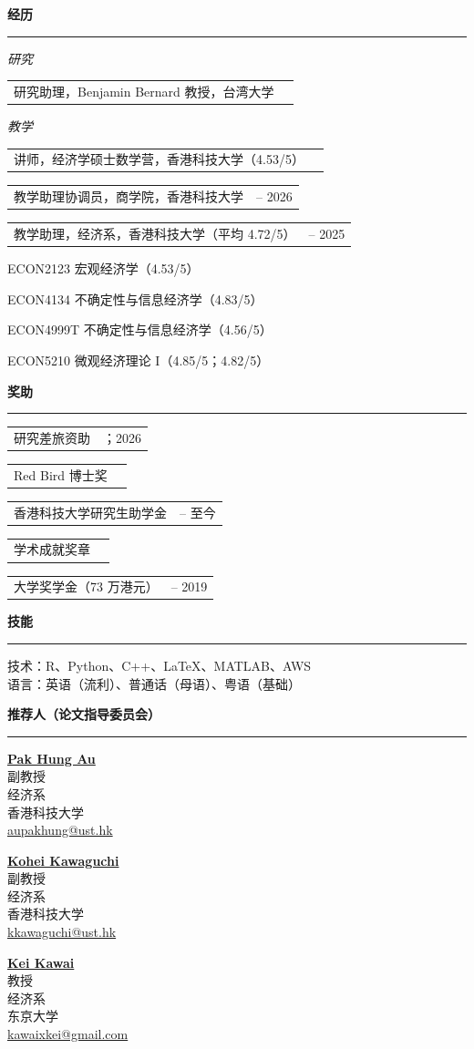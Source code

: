 \documentclass[11pt,letterpaper]{article}
\makeatletter
\newlength{\cvdatecol}
\newcommand{\sectionheader}[1]{%
  \vspace{0.45em}
  {\large\bfseries #1}\\[-0.15em]
  \rule{\textwidth}{0.4pt}\par
  \vspace{0.2em}
}
\newcommand{\cvline}[3][0em]{%
  \par\nobreak
  \noindent\hspace*{#1}%
  \begin{tabularx}{\dimexpr\textwidth-#1\relax}{@{}X@{\hspace{0.75em}}>{\raggedleft\arraybackslash}p{\cvdatecol}@{}}
  #2 & #3 \\
  \end{tabularx}%
}
\newcommand{\courseline}[1]{%
  \par\addvspace{0.22em}%
  \noindent\hspace*{3.2em}#1\par
}
\makeatother
\begin{document}
\sectionheader{经历}
{
\textit{研究}\\[-0.4em]
\cvline[1.5em]{研究助理，Benjamin Bernard 教授，台湾大学}{2020}

\vspace{-0.05em}
\textit{教学}\\[-0.4em]
\cvline[1.5em]{讲师，经济学硕士数学营，香港科技大学（4.53/5）}{2026}
\vspace{-0.1em}
\cvline[1.5em]{教学助理协调员，商学院，香港科技大学}{2025 -- 2026}
\vspace{-0.1em}
\cvline[1.5em]{教学助理，经济系，香港科技大学（平均 4.72/5）}{2020 -- 2025}
\vspace{0.05em}
\courseline{ECON2123 宏观经济学（4.53/5）}
\courseline{ECON4134 不确定性与信息经济学（4.83/5）}
\courseline{ECON4999T 不确定性与信息经济学（4.56/5）}
\courseline{ECON5210 微观经济理论 I（4.85/5；4.82/5）}
}

\sectionheader{奖助}
{
\cvline[1.5em]{研究差旅资助}{2023；2026}
\vspace{-0.1em}
\cvline[1.5em]{Red Bird 博士奖}{2022}
\vspace{-0.1em}
\cvline[1.5em]{香港科技大学研究生助学金}{2020 -- 至今}
\vspace{-0.1em}
\cvline[1.5em]{学术成就奖章}{2019}
\vspace{-0.1em}
\cvline[1.5em]{大学奖学金（73 万港元）}{2015 -- 2019}
}

\sectionheader{技能}
技术：R、Python、C++、\LaTeX、MATLAB、AWS\\
语言：英语（流利）、普通话（母语）、粤语（基础）

\sectionheader{推荐人（论文指导委员会）}
{
\noindent
\begin{minipage}[t]{0.48\textwidth}
\textbf{\href{https://aupakhung.weebly.com/}{Pak Hung Au}}\\
副教授\\
经济系\\
香港科技大学\\
\href{mailto:aupakhung@ust.hk}{aupakhung@ust.hk}
\end{minipage}\hfill
\begin{minipage}[t]{0.48\textwidth}
\textbf{\href{https://www.kohei-kawaguchi.com/}{Kohei Kawaguchi}}\\
副教授\\
经济系\\
香港科技大学\\
\href{mailto:kkawaguchi@ust.hk}{kkawaguchi@ust.hk}
\end{minipage}

\vspace{0.85em}
\noindent
\begin{minipage}[t]{0.48\textwidth}
\textbf{\href{https://www.e.u-tokyo.ac.jp/fservice/faculty/kawai/kawai-e/kawai01-e.html}{Kei Kawai}}\\
教授\\
经济系\\
东京大学\\
\href{mailto:kawaixkei@gmail.com}{kawaixkei@gmail.com}
\end{minipage}
}
\end{document}
